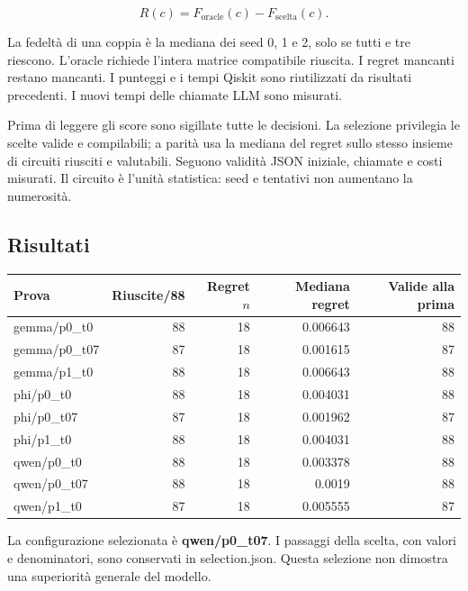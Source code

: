 \[R(c)=F_{\mathrm{oracle}}(c)-F_{\mathrm{scelta}}(c).\]

La fedeltà di una coppia è la mediana dei seed 0, 1 e 2, solo se tutti e tre riescono. L'oracle richiede l'intera matrice compatibile riuscita. I regret mancanti restano mancanti. I punteggi e i tempi Qiskit sono riutilizzati da risultati precedenti. I nuovi tempi delle chiamate LLM sono misurati.

Prima di leggere gli score sono sigillate tutte le decisioni. La selezione privilegia le scelte valide e compilabili; a parità usa la mediana del regret sullo stesso insieme di circuiti riusciti e valutabili. Seguono validità JSON iniziale, chiamate e costi misurati. Il circuito è l'unità statistica: seed e tentativi non aumentano la numerosità.

\subsection{Risultati}

\begin{center}\small\begin{tabular}{lrrrr}\toprule Prova & Riuscite/88 & Regret $n$ & Mediana regret & Valide alla prima\\\midrule

gemma/p0\_t0 & 88 & 18 & 0.006643 & 88\\

gemma/p0\_t07 & 87 & 18 & 0.001615 & 87\\

gemma/p1\_t0 & 88 & 18 & 0.006643 & 88\\

phi/p0\_t0 & 88 & 18 & 0.004031 & 88\\

phi/p0\_t07 & 87 & 18 & 0.001962 & 87\\

phi/p1\_t0 & 88 & 18 & 0.004031 & 88\\

qwen/p0\_t0 & 88 & 18 & 0.003378 & 88\\

qwen/p0\_t07 & 88 & 18 & 0.0019 & 88\\

qwen/p1\_t0 & 87 & 18 & 0.005555 & 87\\

\bottomrule\end{tabular}\end{center}

La configurazione selezionata è \textbf{qwen/p0\_t07}. I passaggi della scelta, con valori e denominatori, sono conservati in selection.json. Questa selezione non dimostra una superiorità generale del modello.

